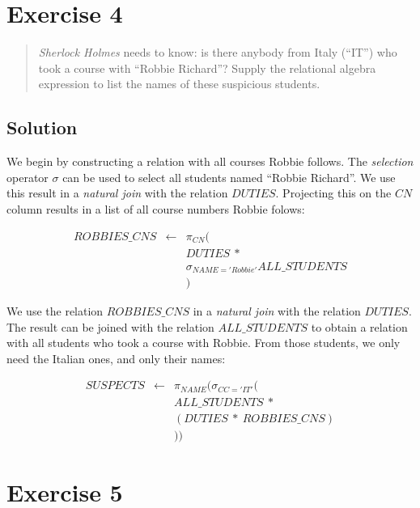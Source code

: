 \documentclass[11pt]{article}
\begin{document}
\newpage

\section{Exercise 4}

\begin{quote}
\emph{Sherlock Holmes} needs to know: is there anybody from Italy (``IT'') who took a course with ``Robbie Richard''? Supply the relational algebra expression to list the names of these suspicious students.
\end{quote}

\subsection*{Solution}

We begin by constructing a relation with all courses Robbie follows. The \emph{selection} operator $\sigma$ can be used to select all students named ``Robbie Richard''. We use this result in a \emph{natural join} with the relation $DUTIES$. Projecting this on the $CN$ column results in a list of all course numbers Robbie folows:

\begin{eqnarray*}
ROBBIES\_CNS & \gets & \pi_{CN} ( \\
& & DUTIES \ \ast \\
& & \sigma_{NAME='Robbie'}ALL\_STUDENTS \\
& & )
\end{eqnarray*}

We use the relation $ROBBIES\_CNS$ in a \emph{natural join} with the relation $DUTIES$. The result can be joined with the relation $ALL\_STUDENTS$ to obtain a relation with all students who took a course with Robbie. From those students, we only need the Italian ones, and only their names:

\begin{eqnarray*}
SUSPECTS & \gets & \pi_{NAME} ( \sigma_{CC='IT'} ( \\
& & ALL\_STUDENTS \ \ast \\
& & (DUTIES \ \ast \ ROBBIES\_CNS) \\
& & ))
\end{eqnarray*}


\newpage

\section{Exercise 5}
\end{document}
